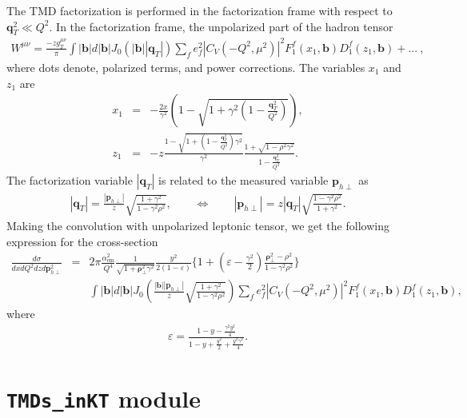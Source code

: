 \documentclass[prd,nofootinbib,eqsecnum,final]{revtex4}
\newcommand{\nn}{\nonumber}
\renewcommand{\(}{\left(}
\renewcommand{\)}{\right)}
\renewcommand{\[}{\left[}
\renewcommand{\]}{\right]}
\renewcommand{\vec}[1]{\bm{#1}}
\begin{document}
The TMD factorization is performed in the factorization frame with respect to $\vec q_T^2\ll Q^2$. In the factorization frame, the unpolarized part of the hadron tensor 
\begin{eqnarray}
W^{\mu\nu}=\frac{-zg_T^{\mu\nu}}{\pi}\int |\vec b| d |\vec b| J_0(|\vec b| |\vec q_T|)\sum_f e_f^2 |C_V(-Q^2,\mu^2)|^2 F_1^f(x_1,\vec b)D_1^f(z_1,\vec b)+...~,
\end{eqnarray}
where dots denote, polarized terms, and power corrections. The variables $x_1$ and $z_1$ are
\begin{eqnarray}
x_1&=&-\frac{2x}{\gamma^2}\(1-\sqrt{1+\gamma^2\(1-\frac{\vec q_T^2}{Q^2}\)}\),
\\
z_1&=&-z\frac{1-\sqrt{1+\(1-\frac{\vec q_T^2}{Q^2}\)\gamma^2}}{\gamma^2}\frac{1+\sqrt{1-\rho^2 \gamma^2}}{1-\frac{\vec q_T^2}{Q^2}}.
\end{eqnarray}
The factorization variable $|\vec q_T|$ is related to the measured variable $\vec p_{h\perp}$ as
\begin{eqnarray}
|\vec q_T|=\frac{|\vec p_{h\perp}|}{z}\sqrt{\frac{1+\gamma^2}{1-\gamma^2\rho^2}},\qquad \Leftrightarrow \qquad |\vec p_{h\perp}|=z |\vec q_T|\sqrt{\frac{1-\gamma^2\rho^2}{1+\gamma^2}}.
\end{eqnarray}
Making the convolution with unpolarized leptonic tensor, we get the following expression for the cross-section
\begin{eqnarray}
\frac{d\sigma}{dx dQ^2 dz d\vec p_{h\perp}^2}&=&2\pi\frac{\alpha^2_{\text{em}}}{Q^4}\frac{1}{\sqrt{1+\vec \rho_{\perp}^2 \gamma^2}}\frac{y^2}{2(1-\varepsilon)}
\Bigg\{1+\(\varepsilon-\frac{\gamma^2}{2}\)\frac{\vec \rho^2_\perp-\rho^2}{1-\gamma^2\rho^2}\Bigg\}
\\\nn && \int |\vec b|d|\vec b| J_0\(\frac{|\vec b||\vec p_{h\perp}|}{z}\sqrt{\frac{1+\gamma^2}{1-\gamma^2 \rho^2}}\)\sum_f e_f^2|C_V(-Q^2,\mu^2)|^2 F_1^f(x_1,\vec b)D_1^f(z_1,\vec b),
\end{eqnarray}
where
\begin{eqnarray}
\varepsilon=\frac{1-y-\frac{\gamma^2y^2}{4}}{1-y+\frac{y^2}{2}+\frac{y^2 \gamma^2}{4}}.
\end{eqnarray}

\newpage
\section{\texttt{TMDs\_inKT} module}
\label{TMDs-inKT}
\end{document}

